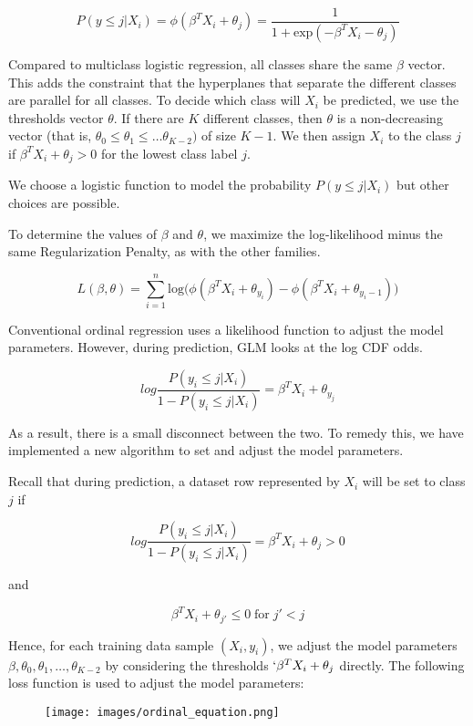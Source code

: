 $$P(y \leq j|X_i) = \phi(\beta^{T}X_i + \theta_j) = \dfrac {1} {1+ \text{exp} (-\beta^{T}X_i - \theta_j)}$$

Compared to multiclass logistic regression, all classes share the same $\beta$ vector. This adds the constraint that the hyperplanes that separate the different classes are parallel for all classes. To decide which class will $X_i$ be predicted, we use the thresholds vector $\theta$. If there are $K$ different classes, then $\theta$ is a non-decreasing vector (that is, $\theta_0 \leq \theta_1 \leq \ldots \theta_{K-2})$ of size $K-1$. We then assign $X_i$ to the class $j$ if $\beta^{T}X_i + \theta_j > 0$ for the lowest class label $j$.

We choose a logistic function to model the probability $P(y \leq j|X_i)$ but other choices are possible. 

To determine the values of $\beta$ and $\theta$, we maximize the log-likelihood minus the same Regularization Penalty, as with the other families. 

$$L(\beta,\theta) = \sum_{i=1}^{n} \text{log} \big( \phi (\beta^{T}X_i + \theta_{y_i}) - \phi(\beta^{T}X_i + \theta_{{y_i}-1}) \big)$$

Conventional ordinal regression uses a likelihood function to adjust the model parameters. However, during prediction, GLM looks at the log CDF odds. 

$$log \frac {P(y_i \leq j|X_i)} {1 - P(y_i \leq j|X_i)} = \beta^{T}X_i + \theta_{y_j}$$

As a result, there is a small disconnect between the two. To remedy this, we have implemented a new algorithm to set and adjust the model parameters. 

Recall that during prediction, a dataset row represented by $X_i$ will be set to class $j$ if 

$$log \frac {P(y_i \leq j|X_i)} {1 - P(y_i \leq j|X_i)} = \beta^{T}X_i + \theta_{j} > 0 $$

and

$$\beta^{T}X_i + \theta_{j'} \leq 0 \; \text{for} \; j' < j$$

Hence, for each training data sample $(X_{i}, y_i)$, we adjust the model parameters $\beta, \theta_0, \theta_1, \ldots, \theta_{K-2}$ by considering the thresholds $`\beta^{T}X_i + \theta_j$ directly. The following loss function is used to adjust the model parameters:

\begin{figure}[h]
\centering
\texttt{[image: images/ordinal\_equation.png]}
\end{figure}

